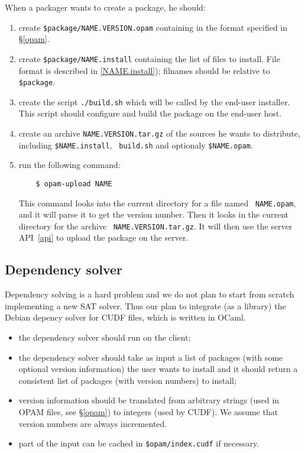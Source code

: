 \documentclass[a4paper,11pt]{article}
\begin{document}
\begin{itemize}
When a packager wants to create a package, he should:

\begin{enumerate}

\item create {\tt \$package/NAME.VERSION.opam} containing in the format
  specified in \S\ref{opam}.

\item create {\tt \$package/NAME.install} containing the list of files
  to install. File format is described in \ref{NAME.install});
  filnames should be relative to {\tt \$package}.

\item create the script {\tt ./build.sh} which will be called by the
  end-user installer. This script should configure and build the
  package on the end-user host.

\item create an archive {\tt NAME.VERSION.tar.gz} of the sources he
  wants to distribute, including {\tt \$NAME.install}, {\tt
    build.sh} and optionaly {\tt \$NAME.opam}.

\item run the following command:

\begin{verbatim}
    $ opam-upload NAME
\end{verbatim}

This command looks into the current directory for a file named {\tt
  NAME.opam}, and it will parse it to get the version number. Then it
looks in the current directory for the archive {\tt
  NAME.VERSION.tar.gz}. It will then use the server API~\ref{api} to
upload the package on the server.

\end{enumerate}

\subsection{Dependency solver}
\label{deps}

Dependency solving is a hard problem and we do not plan to start from
scratch implementing a new SAT solver. Thus our plan to integrate (as
a library) the Debian depency solver for CUDF files, which is written
in OCaml.

\begin{itemize}
\item the dependency solver should run on the client;
\item the dependency solver should take as input a list of packages
  (with some optional version information) the user wants to install
  and it should return a consistent list of packages (with version
  numbers) to install;
\item version information should be translated from arbitrary strings
  (used in OPAM files, see \S\ref{opam}) to integers (used by
  CUDF). We assume that version numbers are always incremented.
\item part of the input can be cached in {\tt \$opam/index.cudf}
  if necessary.
\end{itemize}


\end{itemize}
\end{document}
